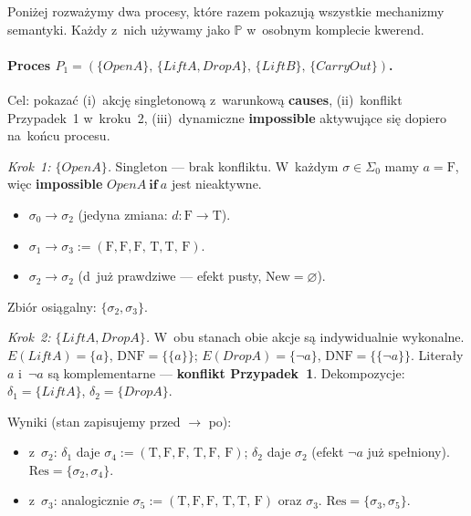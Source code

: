 \documentclass[11pt,a4paper]{article}
\newcommand{\causes}{\textbf{causes}}
\renewcommand{\iff}{\textbf{if}}
\newcommand{\impossible}{\textbf{impossible}}
\newcommand{\DNF}{\mathrm{DNF}}
\theoremstyle{definition}
\begin{document}
\medskip
\noindent Poniżej rozważymy dwa procesy, które razem pokazują wszystkie
mechanizmy semantyki. Każdy z~nich używamy jako $\mathbb{P}$ w~osobnym
komplecie kwerend.

\paragraph{Proces $P_1 = (\{\mathit{OpenA}\},\, \{\mathit{LiftA}, \mathit{DropA}\},\,
\{\mathit{LiftB}\},\, \{\mathit{CarryOut}\})$.}
Cel: pokazać (i)~akcję singletonową z~warunkową \causes{},
(ii)~konflikt Przypadek~1 w~kroku~2,
(iii)~dynamiczne \impossible{} aktywujące się dopiero na~końcu procesu.

\medskip
\noindent\textit{Krok~1: $\{\mathit{OpenA}\}$.} Singleton --- brak konfliktu.
W~każdym $\sigma \in \Sigma_0$ mamy $a = \text{F}$, więc \impossible{}
$\mathit{OpenA}\ \iff\ a$ jest nieaktywne.
\begin{itemize}[topsep=2pt]
  \item $\sigma_0 \to \sigma_2$ (jedyna zmiana: $d\colon \text{F} \to \text{T}$).
  \item $\sigma_1 \to \sigma_3 := (\text{F},\text{F},\text{F},\,\text{T},\text{T},\,\text{F})$.
  \item $\sigma_2 \to \sigma_2$ (d~już prawdziwe --- efekt pusty, $\mathrm{New} = \varnothing$).
\end{itemize}
Zbiór osiągalny: $\{\sigma_2, \sigma_3\}$.

\medskip
\noindent\textit{Krok~2: $\{\mathit{LiftA}, \mathit{DropA}\}$.}
W~obu stanach obie akcje są indywidualnie wykonalne.
$E(\mathit{LiftA}) = \{a\}$, $\DNF = \{\{a\}\}$;
$E(\mathit{DropA}) = \{\neg a\}$, $\DNF = \{\{\neg a\}\}$.
Literały $a$ i~$\neg a$ są komplementarne --- \textbf{konflikt Przypadek~1}.
Dekompozycje: $\delta_1 = \{\mathit{LiftA}\}$, $\delta_2 = \{\mathit{DropA}\}$.

\smallskip
Wyniki (stan zapisujemy przed $\to$ po):
\begin{itemize}[topsep=2pt]
  \item z~$\sigma_2$: $\delta_1$ daje
        $\sigma_4 := (\text{T},\text{F},\text{F},\,\text{T},\text{F},\,\text{F})$;
        $\delta_2$ daje $\sigma_2$ (efekt $\neg a$ już spełniony).
        $\mathrm{Res} = \{\sigma_2, \sigma_4\}$.
  \item z~$\sigma_3$: analogicznie
        $\sigma_5 := (\text{T},\text{F},\text{F},\,\text{T},\text{T},\,\text{F})$
        oraz $\sigma_3$. $\mathrm{Res} = \{\sigma_3, \sigma_5\}$.
\end{itemize}
\end{document}
